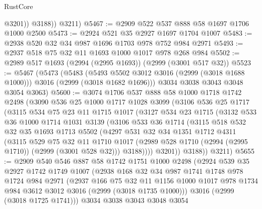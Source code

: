 \begin{lexlean}{RustCore}
\begin{coremodule}
              @3201))
          @3188))
      @3211)
@5467 := @2909 @522 @537 @888 @58 @1697 @1706 @1000 @2500
@5473 := @2924 @521 @35 @2927 @1697 @1704 @1007
@5483 := @2938 @520 @32 @34 @987 @1696 @1703 @978 @752 @984 @2971
@5493 := @2937 @518 @75 @32 @11 @1693 @1000 @1017 @978 @268 @984
@5502 := @2989 @517 @1693 (@2994 (@2995 @1693)) (@2999 (@3001 @517 @32))
@5523 := @5467
    (@5473
      (@5483
        (@5493 @5502 @3012 @3016 (@2999 (@3018 @1688 @1000)))
        @3016
        (@2999 (@3018 @1682 @1696)))
      @3034
      @3038
      @3043
      @3048
      @3054
      @3063)
@5600 := @3074
    @1706
    @537
    @888
    @58
    @1000
    @1718
    @1742
    @2498
    (@3090
      @536
      @25
      @1000
      @1717
      @1028
      @3099
      (@3106
        @536
        @25
        @1717
        (@3115
          @534
          @75
          @23
          @11
          @1715
          @1017
          (@3127
            @534
            @23
            @1715
            (@3132
              @533
              @36
              @1000
              @1714
              @1031
              @3139
              (@3106
                @533
                @36
                @1714
                (@3115
                  @518
                  @532
                  @32
                  @35
                  @1693
                  @1713
                  @5502
                  (@4297
                    @531
                    @32
                    @34
                    @1351
                    @1712
                    @4311
                    (@3115
                      @529
                      @75
                      @32
                      @11
                      @1710
                      @1017
                      (@2989 @528 @1710 (@2994 (@2995 @1710)) (@2999 (@3001 @528 @32)))
                      @3188))))
              @3201))
          @3188))
      @3211)
@5655 := @2909
    @540
    @546
    @887
    @58
    @1742
    @1751
    @1000
    @2498
    (@2924
      @539
      @35
      @2927
      @1742
      @1749
      @1007
      (@2938
        @168
        @32
        @34
        @987
        @1741
        @1748
        @978
        @1724
        @984
        @2971
        (@2937
          @166
          @75
          @32
          @11
          @1156
          @1000
          @1017
          @978
          @1734
          @984
          @3612
          @3012
          @3016
          (@2999 (@3018 @1735 @1000)))
        @3016
        (@2999 (@3018 @1725 @1741)))
      @3034
      @3038
      @3043
      @3048
      @3054

\end{coremodule}
\end{lexlean}

